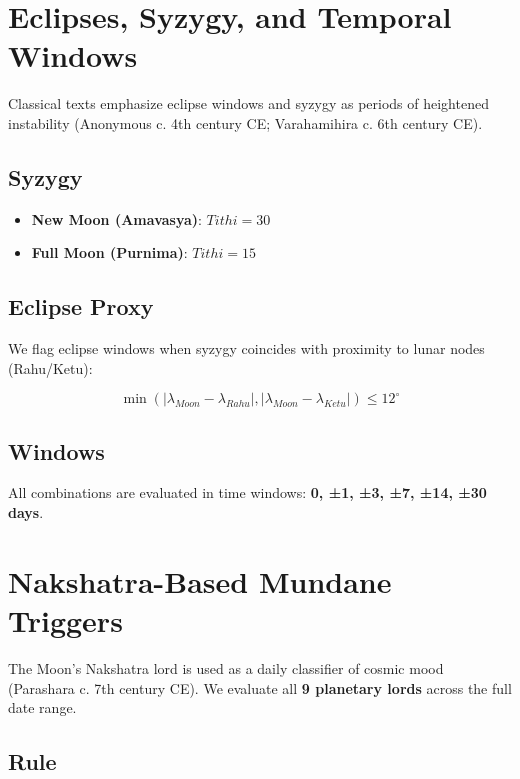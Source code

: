 \documentclass[
  11pt,
  a4paper,
  oneside,
  openany]{report}
\providecommand{\tightlist}{%
  \setlength{\itemsep}{0pt}\setlength{\parskip}{0pt}}\usepackage{longtable,booktabs,array}
\begin{document}
\chapter{Eclipses, Syzygy, and Temporal
Windows}\label{eclipses-syzygy-and-temporal-windows}

Classical texts emphasize eclipse windows and syzygy as periods of
heightened instability (Anonymous c. 4th century CE; Varahamihira c. 6th
century CE).

\section{Syzygy}\label{syzygy}

\begin{itemize}
\tightlist
\item
  \textbf{New Moon (Amavasya)}: \(Tithi = 30\)
\item
  \textbf{Full Moon (Purnima)}: \(Tithi = 15\)
\end{itemize}

\section{Eclipse Proxy}\label{eclipse-proxy}

We flag eclipse windows when syzygy coincides with proximity to lunar
nodes (Rahu/Ketu):

\[
\min(|\lambda_{Moon}-\lambda_{Rahu}|, |\lambda_{Moon}-\lambda_{Ketu}|) \leq 12^\circ
\]

\section{Windows}\label{windows}

All combinations are evaluated in time windows: \textbf{0, ±1, ±3, ±7,
±14, ±30 days}.

\chapter{Nakshatra-Based Mundane
Triggers}\label{nakshatra-based-mundane-triggers}

The Moon's Nakshatra lord is used as a daily classifier of cosmic mood
(Parashara c. 7th century CE). We evaluate all \textbf{9 planetary
lords} across the full date range.

\section{Rule}\label{rule}
\end{document}

